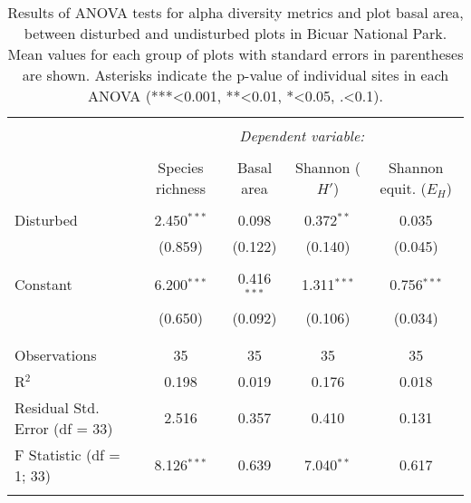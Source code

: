 
\begin{table}[!htbp] \centering 
  \caption{Results of ANOVA tests for alpha diversity metrics and plot basal area, between disturbed and undisturbed plots in Bicuar National Park. Mean values for each group of plots with standard errors in parentheses are shown. Asterisks indicate the p-value of individual sites in each ANOVA (***<0.001, **<0.01, *<0.05, .<0.1).} 
  \label{degrad_anova_table} 
\begin{tabular}{@{\extracolsep{0pt}}lcccc} 
\\[-1.8ex]\hline 
\hline \\[-1.8ex] 
 & \multicolumn{4}{c}{\textit{Dependent variable:}} \\ 
\cline{2-5} 
\\[-1.8ex] & Species richness & Basal area & Shannon ($H'$) & Shannon equit. ($E_{H}$) \\ 
\hline \\[-1.8ex] 
 Disturbed & 2.450$^{***}$ & 0.098 & 0.372$^{**}$ & 0.035 \\ 
  & (0.859) & (0.122) & (0.140) & (0.045) \\ 
  & & & & \\ 
 Constant & 6.200$^{***}$ & 0.416$^{***}$ & 1.311$^{***}$ & 0.756$^{***}$ \\ 
  & (0.650) & (0.092) & (0.106) & (0.034) \\ 
  & & & & \\ 
\hline \\[-1.8ex] 
Observations & 35 & 35 & 35 & 35 \\ 
R$^{2}$ & 0.198 & 0.019 & 0.176 & 0.018 \\ 
Residual Std. Error (df = 33) & 2.516 & 0.357 & 0.410 & 0.131 \\ 
F Statistic (df = 1; 33) & 8.126$^{***}$ & 0.639 & 7.040$^{**}$ & 0.617 \\ 
\hline 
\hline \\[-1.8ex] 
\end{tabular} 
\end{table} 

